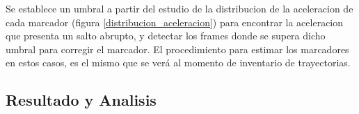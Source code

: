 \begin{itemize}
Se establece un umbral a partir del estudio de la distribucion de la aceleracion de cada marcador (figura \ref{distribucion_aceleracion}) para encontrar la aceleracion que presenta un salto abrupto, y detectar los frames donde se supera dicho umbral para corregir el marcador. El procedimiento para estimar los marcadores en estos casos, es el mismo que se verá al momento de inventario de trayectorias.
\begin{figure}[H]
 \centering
 \caption{}
\end{figure}

\end{itemize}




\subsection{Resultado y Analisis}


